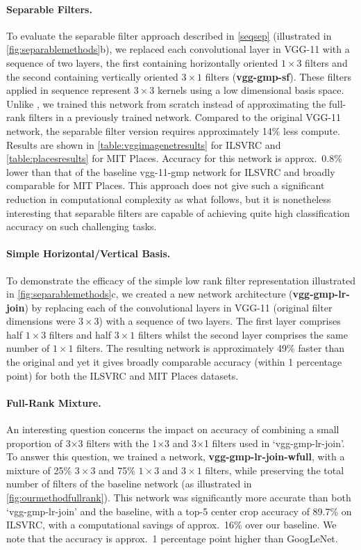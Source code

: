 \documentclass[thesis]{subfiles}
\begin{document}
    
    \paragraph{Separable Filters.} To evaluate the separable filter approach described in \cref{seqsep} (illustrated in \cref{fig:separablemethods}b), we replaced each convolutional layer in VGG-11 with a sequence of two layers, the first containing horizontally oriented $1 \times 3$ filters and the second containing vertically oriented $3 \times 1$ filters (\textbf{vgg-gmp-sf}). These filters applied in sequence represent $3 \times 3$ kernels using a low dimensional basis space. Unlike \citet{journals/corr/JaderbergVZ14}, we trained this network from scratch instead of approximating the full-rank filters in a previously trained network. Compared to the original VGG-11 network, the separable filter version requires approximately 14\% less compute. Results are shown in \cref{table:vggimagenetresults} for ILSVRC and \cref{table:placesresults} for MIT Places. Accuracy for this network is approx.~0.8\% lower than that of the baseline vgg-11-gmp network for ILSVRC and broadly comparable for MIT Places. This approach does not give such a significant reduction in computational complexity as what follows, but it is nonetheless interesting that separable  filters are capable of achieving quite high classification accuracy on such challenging tasks.
    
    \paragraph{Simple Horizontal/Vertical Basis.} To demonstrate the efficacy of the simple low rank filter representation illustrated in \cref{fig:separablemethods}c, we created a new network architecture (\textbf{vgg-gmp-lr-join}) by replacing each of the convolutional layers in VGG-11 (original filter dimensions were $3 \times 3$) with a sequence of two layers. The first layer comprises half $1\times 3$ filters and half $3\times 1$ filters whilst the second layer comprises the same number of $1\times 1$ filters. The resulting network is approximately 49\% faster than the original and yet it gives broadly comparable accuracy (within 1 percentage point) for both the ILSVRC and MIT Places datasets.
    
    \paragraph{Full-Rank Mixture.} An interesting question concerns the impact on accuracy of combining a small proportion of 3×3 filters with the 1×3 and 3×1 filters used in ‘vgg-gmp-lr-join’. To answer this question, we trained a network, \textbf{vgg-gmp-lr-join-wfull}, with a mixture of 25\% $3 \times 3$ and 75\% $1 \times 3$ and $3 \times 1$ filters, while preserving the total number of filters of the baseline network (as illustrated in \cref{fig:ourmethodfullrank}). This network was significantly more accurate than both `vgg-gmp-lr-join' and the baseline, with a top-5 center crop accuracy of 89.7\% on ILSVRC, with a computational savings of approx.~16\% over our baseline. We note that the accuracy is approx.~1 percentage point higher than GoogLeNet.
    
\end{document}
